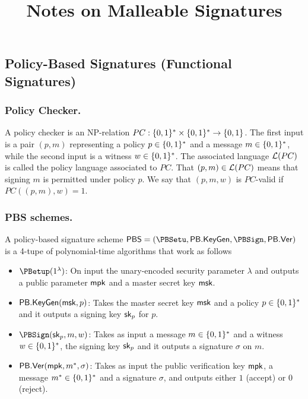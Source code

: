 \documentclass[11pt]{llncs}
\title{Notes on Malleable Signatures}
\author{}
\institute{}
\begin{document}
\maketitle



\subsection{Policy-Based Signatures (Functional Signatures)} %

\subsubsection{Policy Checker.} A policy checker
is an NP-relation $PC: \{0,1\}^* \times \{0,1\}^* \to \{0,1\}$. The first input is a
pair $(p, m)$ representing a policy $p \in  \{0,1\}^*$ and a message
$m \in  \{0,1\}^*$, while the second input is a witness $w \in  \{0,1\}^*$.
 The associated language ${\cal L}(PC)$ is called the policy language associated to
$PC$. That $(p,m) \in  {\cal L}(PC)$ means that signing
$m$ is permitted under policy $p$. We say that
$(p,m,w)$ is $PC$-valid if $PC((p,m),w) = 1$.
\subsubsection{PBS schemes.}
A policy-based signature scheme $\PBS= (\PBSetu, \PBKG, \PBSign, \PBVer)$ is a 4-tupe of  polynomial-time algorithms that work as follows

\begin{itemize}
\item $\PBetup(1^\lambda)$: On input the unary-encoded security parameter
$\lambda$ and outputs a public
parameter ${\sf mpk}$ and a master secret key ${\sf msk}$.

\item ${\sf PB.KeyGen}({\sf msk}, p)$: Takes the master secret key ${\sf msk}$ and a policy $p \in  \{0,1\}^*$ and it outputs a signing key ${\sf sk}_p$ for $p$.

\item $\PBSign(\sk_p, m, w)$: Takes as input a message $m \in \{0,1\}^*$ and a witness $w \in \{0,1\}^*$, the signing key
${\sf sk}_p$ and it outputs a signature $\sigma$  on $m$.

\item ${\sf PB.Ver}({\sf mpk},  m^*, \sigma)$: Takes as input the public verification key ${\sf mpk}$, a message $m^* \in \{0,1\}^*$ and a signature $\sigma$, and outputs either $1$ (accept) or $0$ (reject).
\end{itemize}
\end{document}
